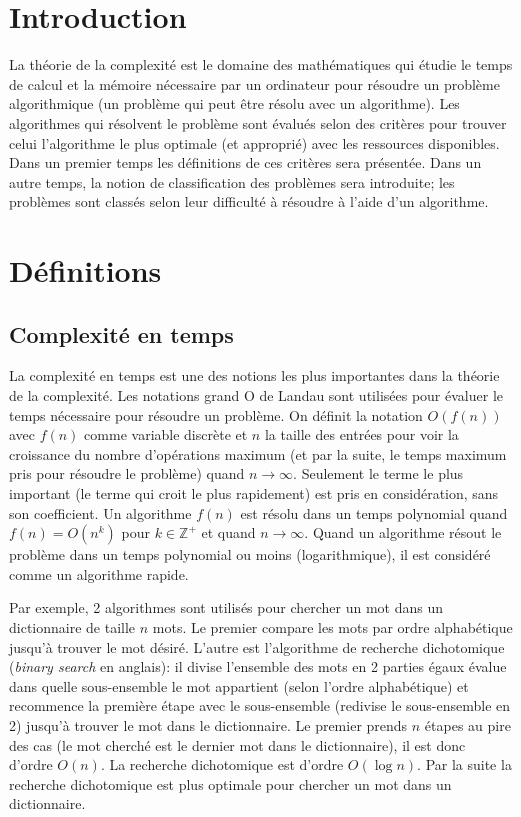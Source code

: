 \documentclass[../main.tex]{subfiles}
\begin{document}
\section{Introduction}
La théorie de la complexité est le domaine des mathématiques qui étudie le temps de calcul et la mémoire nécessaire par un ordinateur pour résoudre un
problème algorithmique (un problème qui peut être résolu avec un algorithme). Les algorithmes qui résolvent le problème sont évalués selon des critères
pour trouver celui l'algorithme le plus optimale (et approprié) avec les ressources disponibles. Dans un premier temps les définitions de ces critères sera
présentée. Dans un autre temps, la notion de classification des problèmes sera introduite; les problèmes sont classés selon leur \og difficulté \fg{} à
résoudre à l'aide d'un algorithme.

\section{Définitions}
\subsection{Complexité en temps}
La complexité en temps est une des notions les plus importantes dans la théorie de la complexité. Les notations grand O de Landau sont utilisées pour évaluer
le temps nécessaire pour résoudre un problème. On définit la notation $O(f(n))$ avec $f(n)$ comme variable discrète et $n$ la taille des entrées
pour voir la croissance du nombre d'opérations maximum (et par la suite, le temps maximum pris pour résoudre le problème) quand $n\to\infty$.
Seulement le terme le plus important (le terme qui croit le plus rapidement) est pris en considération, sans son coefficient.
Un algorithme $f(n)$ est résolu dans un temps polynomial quand $f(n)=O(n^k)$ pour $k \in \mathbb{Z}^+$ et quand $n\to\infty$. Quand un algorithme résout le problème dans un temps polynomial ou moins (logarithmique), il est considéré comme un algorithme rapide.

Par exemple, 2 algorithmes sont utilisés pour chercher un mot dans un dictionnaire de taille $n$ mots. Le premier compare les mots par ordre alphabétique jusqu'à trouver le mot désiré. L'autre est l'algorithme de recherche dichotomique (\emph{binary search} en anglais): il divise l'ensemble des mots en 2 parties égaux évalue dans quelle sous-ensemble le mot appartient (selon l'ordre alphabétique) et recommence la première étape avec le sous-ensemble (redivise le sous-ensemble en 2) jusqu'à trouver le mot dans le dictionnaire. Le premier prends $n$ étapes au pire des cas (le mot cherché est le dernier mot dans le dictionnaire), il est donc d'ordre $O(n)$. La recherche dichotomique est d'ordre $O(\log n)$. Par la suite la recherche dichotomique est plus optimale pour chercher un mot dans un dictionnaire.
\end{document}
